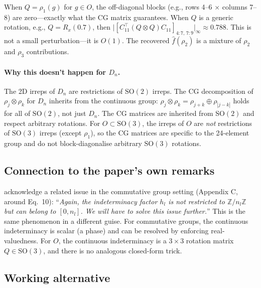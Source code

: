 \documentclass{article}
\theoremstyle{definition}
\theoremstyle{remark}
\newcommand{\SO}{\mathrm{SO}}
\newcommand{\abs}[1]{\lvert #1 \rvert}
\theoremstyle{definition}
\begin{document}
When $Q = \rho_1(g)$ for $g \in O$, the off-diagonal blocks (e.g.,
rows 4--6 $\times$ columns 7--8) are zero---exactly what the CG
matrix guarantees. When $Q$ is a generic rotation, e.g.,
$Q = R_x(0.7)$, then
$\abs{[C_{11}^\top (Q \otimes Q) C_{11}]_{4:7,\, 7:9}}_\infty
\approx 0.788$.
This is not a small perturbation---it is $O(1)$. The recovered
$\hat{f}(\rho_2)$ is a mixture of $\rho_2$ and $\rho_3$ contributions.

\paragraph{Why this doesn't happen for $D_n$.}
The 2D irreps of $D_n$ are restrictions of $\SO(2)$ irreps. The CG
decomposition of $\rho_j \otimes \rho_k$ for $D_n$ inherits from the
continuous group: $\rho_j \otimes \rho_k = \rho_{j+k} \oplus
\rho_{|j-k|}$ holds for all of $\SO(2)$, not just $D_n$. The CG
matrices are inherited from $\SO(2)$ and respect arbitrary rotations.
For $O \subset \SO(3)$, the irreps of $O$ are \emph{not} restrictions
of $\SO(3)$ irreps (except $\rho_1$), so the CG matrices are specific
to the 24-element group and do not block-diagonalise arbitrary
$\SO(3)$ rotations.

\subsection{Connection to the paper's own remarks}

\citet{mataigne2024selective} acknowledge a related issue in the
commutative group setting (Appendix C, around Eq.~10):
``\emph{Again, the indeterminacy factor $h_l$ is not restricted to
$\mathbb{Z}/n_l\mathbb{Z}$ but can belong to $[0, n_l]$. We will
have to solve this issue further.}''
This is the same phenomenon in a different guise. For commutative
groups, the continuous indeterminacy is scalar (a phase) and can be
resolved by enforcing real-valuedness. For $O$, the continuous
indeterminacy is a $3 \times 3$ rotation matrix $Q \in \SO(3)$, and
there is no analogous closed-form trick.

\subsection{Working alternative}
\end{document}
